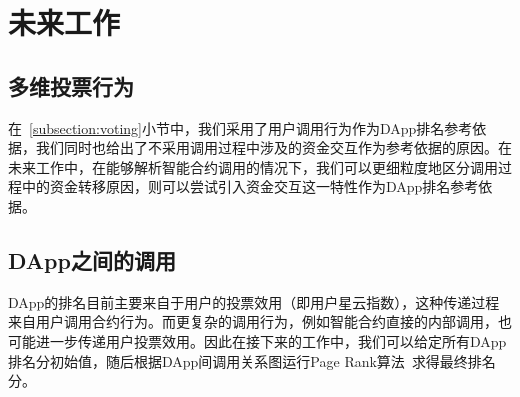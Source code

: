 \section{未来工作}
\subsection{多维投票行为}
在~\ref{subsection:voting}小节中，我们采用了用户调用行为作为DApp排名参考依据，我们同时也给出了不采用调用过程中涉及的资金交互作为参考依据的原因。在未来工作中，在能够解析智能合约调用的情况下，我们可以更细粒度地区分调用过程中的资金转移原因，则可以尝试引入资金交互这一特性作为DApp排名参考依据。

\subsection{DApp之间的调用}
DApp的排名目前主要来自于用户的投票效用（即用户星云指数），这种传递过程来自用户调用合约行为。而更复杂的调用行为，例如智能合约直接的内部调用，也可能进一步传递用户投票效用。因此在接下来的工作中，我们可以给定所有DApp排名分初始值，随后根据DApp间调用关系图运行Page Rank算法~\cite{page1999pagerank}求得最终排名分。

